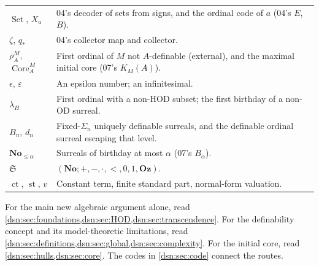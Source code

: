 \documentclass[11pt,a4paper]{article}
\numberwithin{equation}{section}
\theoremstyle{definition}
\theoremstyle{remark}
\newcommand{\No}{\mathbf{No}}
\newcommand{\Oz}{\mathbf{Oz}}
\newcommand{\OD}{\mathrm{OD}}
\newcommand{\HOD}{\mathrm{HOD}}
\newcommand{\ct}{\operatorname{ct}}
\newcommand{\st}{\operatorname{st}}
\newcommand{\SetDec}{\operatorname{Set}}
\newcommand{\Core}{\operatorname{Core}}
\begin{document}
\begin{longtable}{@{}P{0.24\textwidth}P{0.70\textwidth}@{}}
$\SetDec$, $X_a$ & 04's decoder of sets from signs, and the ordinal code of
$a$ (04's $E$, $B$).\\[3pt]
$\zeta$, $q_*$ & 04's collector map and collector.\\[3pt]
$\rho^M_A$, $\Core^M_A$ & First ordinal of $M$ not $A$-definable (external),
and the maximal initial core (07's $K_M(A)$).\\[3pt]
$\epsilon$, $\varepsilon$ & An epsilon number; an infinitesimal.\\[3pt]
$\lambda_H$ & First ordinal with a non-$\HOD$ subset; the first birthday of
a non-$\OD$ surreal.\\[3pt]
$B_n$, $d_n$ & Fixed-$\Sigma_n$ uniquely definable surreals, and the
definable ordinal surreal escaping that level.\\[3pt]
$\No_{\le\alpha}$ & Surreals of birthday at most $\alpha$ (07's
$B_\alpha$).\\[3pt]
$\mathfrak S$ & $(\No;+,-,\cdot,<,0,1,\Oz)$.\\[3pt]
$\ct$, $\st$, $v$ & Constant term, finite standard part, normal-form
valuation.\\
\bottomrule
\end{longtable}

For the main new algebraic argument alone, read
\cref{dsn:sec:foundations,dsn:sec:HOD,dsn:sec:transcendence}. For the
definability concept and its model-theoretic limitations, read
\cref{dsn:sec:definitions,dsn:sec:global,dsn:sec:complexity}. For the
initial core, read \cref{dsn:sec:hulls,dsn:sec:core}. The codes in
\cref{dsn:sec:code} connect the routes.
\end{document}
